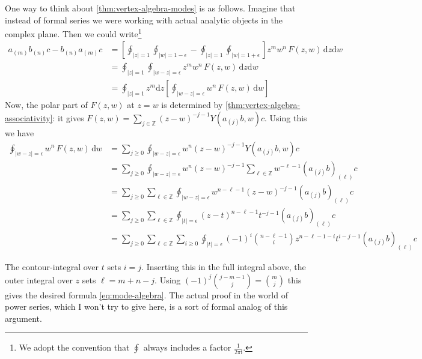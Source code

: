\documentclass[12pt,letterpaper,reqno]{amsart}
\numberwithin{equation}{section}
\newcommand{\bbZ}{\ensuremath{\mathbb Z}}
\newcommand{\I}{{\mathrm i}}
\newcommand{\de}{\mathrm{d}}
\newcommand{\abs}[1]{\lvert#1\rvert}
\newcommand{\eps}{\epsilon}
\begin{document}
One way to think about \autoref{thm:vertex-algebra-modes}
is as follows. Imagine that instead of formal series we
were working with actual analytic objects in the complex plane.
Then we could write\footnote{We adopt the convention that $\oint$ always includes a factor $\frac{1}{2 \pi \I}$.}
\begin{align}
a_{(m)} b_{(n)} c - b_{(n)} a_{(m)} c &= \left[  \oint_{\abs{z}=1} \oint_{\abs{w} = 1-\eps} - \oint_{\abs{z}=1} \oint_{\abs{w} = 1+\eps} \right]z^m w^n \, F(z,w) \, \de z \de w \\
&=  \oint_{\abs{z}=1} \oint_{\abs{w-z} = \eps} z^m w^n \, F(z,w) \, \de z \de w \\
&=  \oint_{\abs{z}=1} z^m \de z  \left[\oint_{\abs{w-z} = \eps} w^n \, F(z,w) \, \de w \right] 
\end{align}
Now, the polar part of $F(z,w)$ at $z=w$ is determined by
\autoref{thm:vertex-algebra-associativity}: it gives
$F(z,w) = \sum_{j \in \bbZ} (z-w)^{-j-1} Y(a_{(j)}b,w) c$.
Using this
we have
\begin{align}
  \oint_{\abs{w-z} = \eps} w^n \, F(z,w) \, \de w &= \sum_{j \ge 0} \oint_{\abs{w-z} = \eps} w^n (z-w)^{-j-1} Y(a_{(j)}b,w) c \\
  &= \sum_{j \ge 0} \oint_{\abs{w-z} = \eps} w^n (z-w)^{-j-1} \sum_{\ell \in \bbZ} w^{-\ell-1} (a_{(j)}b)_{(\ell)} c \\
  &= \sum_{j \ge 0}  \sum_{\ell \in \bbZ} \oint_{\abs{w-z} = \eps} w^{n-\ell-1} (z-w)^{-j-1} (a_{(j)}b)_{(\ell)} c \\
  &= \sum_{j \ge 0}  \sum_{\ell \in \bbZ} \oint_{\abs{t} = \eps} (z-t)^{n-\ell-1} t^{-j-1} (a_{(j)}b)_{(\ell)} c \\
  &= \sum_{j \ge 0}  \sum_{\ell \in \bbZ} \sum_{i \ge 0} \oint_{\abs{t} = \eps} (-1)^i \binom{n-\ell-1}{i} z^{n-\ell-1-i} t^{i-j-1} (a_{(j)}b)_{(\ell)} c
\end{align}

The contour-integral over $t$ sets $i=j$. Inserting this in 
the full integral above, the outer integral over $z$ sets $\ell = m+n-j$. Using $(-1)^j \binom{j-m-1}{j} = \binom{m}{j}$ this gives the desired formula \eqref{eq:mode-algebra}.
The actual proof in the world of power series, which 
I won't try to give here, is a sort of 
formal analog of this argument.
\end{document}
